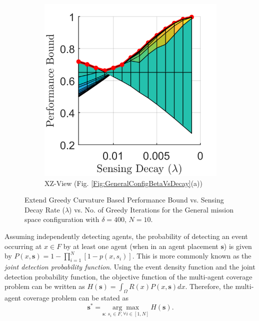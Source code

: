 \documentclass[conference]{IEEEtran}
\begin{document}
\begin{figure}[!h]
\begin{subfigure}[t]{0.17\textwidth}
        \centering
        \includegraphics[width=\textwidth]{Figures/Gen2_Exd3.png}
        \caption{XZ-View (Fig. \ref{Fig:GeneralConfigBetaVsDecay}(a))}
    \end{subfigure}
    \caption{Extend Greedy Curvature Based Performance Bound vs. Sensing Decay Rate ($\lambda$) vs. No. of Greedy Iterations for the General mission space configuration with $\delta=400$, $N=10$.}
    \label{Fig:GeneralConfigBetaVsDecayVsiStar}
\end{figure}
 
 
 
Assuming independently detecting agents, the probability of detecting an event occurring at $x \in F$ by at least one agent (when in an agent placement $\textbf{s}$) is given by $P(x,\textbf{s}) = 1-\prod_{i=1}^N \left[ 1-p(x,s_i) \right]$. This is more commonly known as the \emph{joint detection probability function}. Using the event density function and the joint detection probability function, the objective function of the multi-agent coverage problem can be written as
$H(\textbf{s}) = \int_\Omega R(x)P(x,\textbf{s})dx$. Therefore, the multi-agent coverage problem can be stated as
\begin{equation}\label{Eq:CoverageProblem}
    \textbf{s}^* = \underset{\textbf{s}:\, s_i \in F, \forall i\in [1,N]}{\arg\max}\ H(\textbf{s}).
\end{equation}
\end{document}
